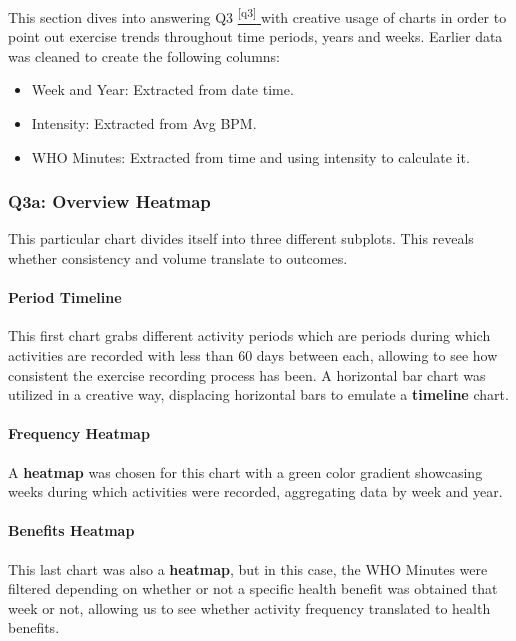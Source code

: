 \documentclass[a4paper,11pt]{article}
\newcommand*{\sref}[1]{%
  \hyperref[{#1}]{%
    \color{accent}\textsuperscript{\ref*{#1}}%
  }%
}
\begin{document}
\par
This section dives into answering Q3\sref{q3} with creative usage of charts in
order to point out exercise trends throughout time periods, years and weeks.
Earlier data was cleaned to create the following columns:

\begin{itemize}
	\item Week and Year: Extracted from date time.
	\item Intensity: Extracted from Avg BPM.
	\item WHO Minutes: Extracted from time and using intensity to calculate it.
\end{itemize}

\subsubsection{Q3a: Overview Heatmap}

\par
This particular chart divides itself into three different subplots. This
reveals whether consistency and volume translate to outcomes.

\paragraph{Period Timeline}
This first chart grabs different activity periods which are periods during
which activities are recorded with less than 60 days between each, allowing to
see how consistent the exercise recording process has been. A horizontal bar
chart was utilized in a creative way, displacing horizontal bars to emulate
a \textbf{timeline} chart.

\paragraph{Frequency Heatmap}

A \textbf{heatmap} was chosen for this chart with a green color gradient showcasing
weeks during which activities were recorded, aggregating data by week and year.

\paragraph{Benefits Heatmap}

This last chart was also a \textbf{heatmap}, but in this case, the WHO Minutes were
filtered depending on whether or not a specific health benefit was obtained
that week or not, allowing us to see whether activity frequency translated
to health benefits.
\end{document}
